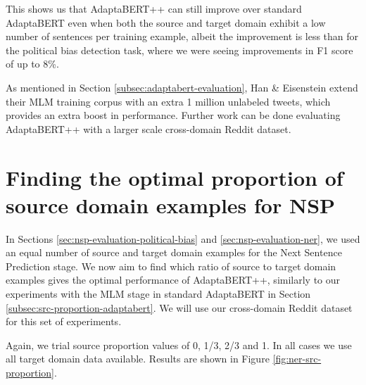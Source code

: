 This shows us that AdaptaBERT++ can still improve over standard AdaptaBERT even when both the source and target domain exhibit a low number of sentences per training example, albeit the improvement is less than for the political bias detection task, where we were seeing improvements in F1 score of up to 8\%.

As mentioned in Section \ref{subsec:adaptabert-evaluation}, Han \& Eisenstein extend their MLM training corpus with an extra 1 million unlabeled tweets, which provides an extra boost in performance. Further work can be done evaluating AdaptaBERT++ with a larger scale cross-domain Reddit dataset.

\section{Finding the optimal proportion of source domain examples for NSP}

In Sections \ref{sec:nsp-evaluation-political-bias} and \ref{sec:nsp-evaluation-ner}, we used an equal number of source and target domain examples for the Next Sentence Prediction stage. We now aim to find which ratio of source to target domain examples gives the optimal performance of AdaptaBERT++, similarly to our experiments with the MLM stage in standard AdaptaBERT in Section \ref{subsec:src-proportion-adaptabert}. We will use our cross-domain Reddit dataset for this set of experiments.

Again, we trial source proportion values of 0, 1/3, 2/3 and 1. In all cases we use all target domain data available. Results are shown in Figure \ref{fig:ner-src-proportion}.

